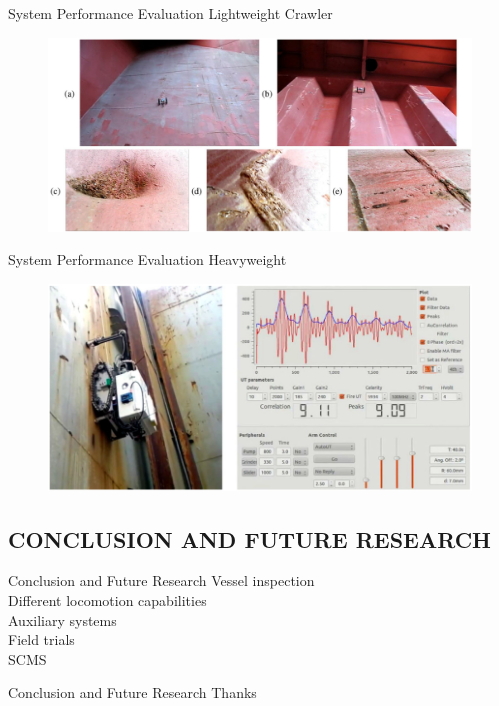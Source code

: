\documentclass{beamer}
\begin{document}
            \begin{frame}{System Performance Evaluation}
                Lightweight Crawler  
                \begin{figure}[htb]
                    \centering
                    \includegraphics[scale=0.2]{figuras/frist_trial_for_the_lightweight_crawler.png}                   
                    \label{}
                \end{figure}         
            \end{frame}
            
            \begin{frame}{System Performance Evaluation}
                Heavyweight 
                \begin{figure}[htb]
                    \centering
                    \includegraphics[scale=0.3]{figuras/MARC_on_a_vertical.png}                   
                    \label{}
                \end{figure}           
            \end{frame}
            
        \subsection{CONCLUSION AND FUTURE RESEARCH}
            \begin{frame}{Conclusion and Future Research}
                Vessel inspection \\
                Different locomotion capabilities \\
                Auxiliary systems \\
                Field trials \\
                SCMS
            \end{frame}
            
            \begin{frame}{Conclusion and Future Research}
                \centering Thanks           
            \end{frame}
\end{document}
